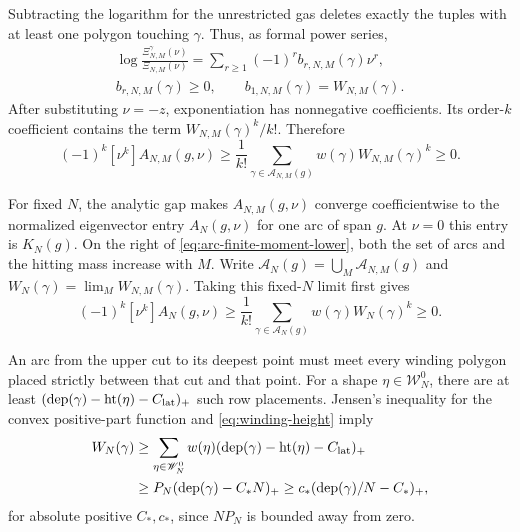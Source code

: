 Subtracting the logarithm for the unrestricted gas deletes exactly the
tuples with at least one polygon touching $\gamma$. Thus, as formal power
series,
\[
 \begin{gathered}
 \log\frac{\Xi_{N,M}^{\gamma}(\nu)}{\Xi_{N,M}(\nu)}
       =\sum_{r\ge1}(-1)^r b_{r,N,M}(\gamma)\nu^r,\\
 b_{r,N,M}(\gamma)\ge0,\qquad
 b_{1,N,M}(\gamma)=W_{N,M}(\gamma).
 \end{gathered}
\]
After substituting $\nu=-z$, exponentiation has nonnegative
coefficients. Its order-$k$ coefficient contains the term
$W_{N,M}(\gamma)^k/k!$. Therefore
\begin{equation}\label{eq:arc-finite-moment-lower}
 (-1)^k[\nu^k]A_{N,M}(g,\nu)
 \ge\frac1{k!}\sum_{\gamma\in\mathscr A_{N,M}(g)}
                  w(\gamma)W_{N,M}(\gamma)^k\ge0.
\end{equation}

For fixed $N$, the analytic gap makes $A_{N,M}(g,\nu)$ converge
coefficientwise to the normalized eigenvector entry $A_N(g,\nu)$ for
one arc of span $g$. At $\nu=0$ this entry is $K_N(g)$. On the right of
\eqref{eq:arc-finite-moment-lower}, both the set of arcs and the hitting
mass increase with $M$. Write $\mathscr A_N(g)=\bigcup_M\mathscr A_{N,M}(g)$
and $W_N(\gamma)=\lim_M W_{N,M}(\gamma)$. Taking this fixed-$N$ limit
first gives
\begin{equation}\label{eq:arc-infinite-moment-lower}
 (-1)^k[\nu^k]A_N(g,\nu)
 \ge\frac1{k!}\sum_{\gamma\in\mathscr A_N(g)}
                   w(\gamma)W_N(\gamma)^k\ge0.
\end{equation}

An arc from the upper cut to its deepest point must meet every winding
polygon placed strictly between that cut and that point. For a shape
$\eta\in\mathscr W_N^0$, there are at least
$(\operatorname{dep}(\gamma)-\operatorname{ht}(\eta)-C_{\rm lat})_+$
such row placements. Jensen's inequality for the convex positive-part
function and \eqref{eq:winding-height} imply
\begin{equation}\label{eq:arc-hit-depth}
 \begin{split}
 W_N(\gamma)
 &\ge\sum_{\eta\in\mathscr W_N^0}w(\eta)
       (\operatorname{dep}(\gamma)-\operatorname{ht}(\eta)-C_{\rm lat})_+\\
 &\ge P_N(\operatorname{dep}(\gamma)-C_*N)_+
  \ge c_*(\operatorname{dep}(\gamma)/N-C_*)_+,
 \end{split}
\end{equation}
for absolute positive $C_*,c_*$, since $NP_N$ is bounded away from zero.

